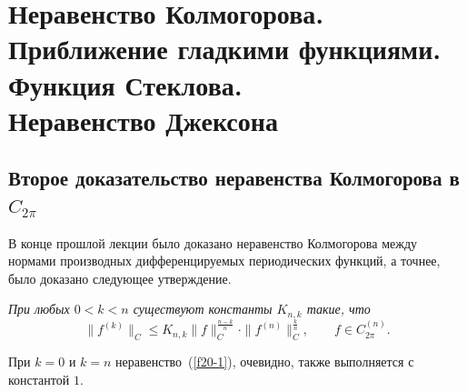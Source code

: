
\chapter{Неравенство Колмогорова.\\
Приближение гладкими функциями.\\ Функция Стеклова.\\
Неравенство Джексона}

\section{Второе доказательство неравенства Колмогорова в $C_{2\pi}$}


 В конце прошлой лекции было доказано неравенство Колмогорова между нормами
 производных дифференцируемых периодических функций, а точнее, было доказано
 следующее утверждение.

 {\it При любых $0<k<n$ существуют константы $K_{n,k}$ такие, что
  \begin{equation}\label{f20-1}
 \|f^{(k)}\|_C\le K_{n,k}\|f\|^{\frac{n-k}{n}}_C\cdot
 \|f^{(n)}\|^{\frac{k}{n}}_C,\qquad f\in C^{(n)}_{{2\pi}}.
 \end{equation}
 }

 При $k=0$ и $k=n$ неравенство~(\ref{f20-1}), очевидно, {также}
 выполняется {с} {константой $1$}.


